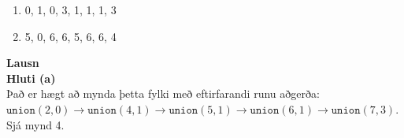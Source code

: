 \documentclass[12pt, a4paper, hidelinks]{article}
\begin{document}
\begin{enumerate}[label=(\alph*)]
    \item 0, 1, 0, 3, 1, 1, 1, 3
    \item 5, 0, 6, 6, 5, 6, 6, 4
\end{enumerate}

\medskip
\noindent
\textbf{\large Lausn} \medskip \\
\textbf{Hluti (a)} \medskip \\
Það er hægt að mynda þetta fylki með eftirfarandi runu aðgerða:
$\texttt{union}(2,0) \to \texttt{union}(4,1) \to \texttt{union}(5,1) \to \texttt{union}(6,1) \to \texttt{union}(7,3)$.
Sjá mynd 4.



\end{document}
